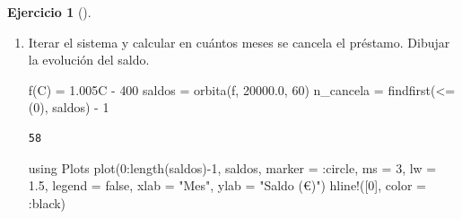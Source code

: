 \documentclass[
  spanish,
  a4paper,
]{scrreport}
\newenvironment{Shaded}{\begin{snugshade}}{\end{snugshade}}
\newcommand{\BuiltInTok}[1]{\textcolor[rgb]{0.00,0.23,0.31}{#1}}
\newcommand{\ConstantTok}[1]{\textcolor[rgb]{0.56,0.35,0.01}{#1}}
\newcommand{\FloatTok}[1]{\textcolor[rgb]{0.68,0.00,0.00}{#1}}
\newcommand{\FunctionTok}[1]{\textcolor[rgb]{0.28,0.35,0.67}{#1}}
\newcommand{\ImportTok}[1]{\textcolor[rgb]{0.00,0.46,0.62}{#1}}
\newcommand{\NormalTok}[1]{\textcolor[rgb]{0.00,0.23,0.31}{#1}}
\newcommand{\OperatorTok}[1]{\textcolor[rgb]{0.37,0.37,0.37}{#1}}
\newcommand{\StringTok}[1]{\textcolor[rgb]{0.13,0.47,0.30}{#1}}
\theoremstyle{definition}
\newtheorem{exercise}{Ejercicio}[chapter]
\theoremstyle{remark}
\begin{document}
\begin{exercise}[]
\begin{enumerate}
\begin{tcolorbox}
  $80000.0$

  El punto fijo es \(C^* = 80\,000\) €: es el saldo para el que los
  intereses (\(0.005\cdot 80000 = 400\)) igualan exactamente la cuota,
  de modo que la deuda no cambiaría. Como la pendiente es
  \(a = 1.005 > 1\), el punto fijo es \textbf{inestable}: si la deuda
  inicial es menor que 80 000 €, decrece hasta amortizarse; si fuera
  mayor, crecería sin control.

  \end{tcolorbox}
\item
  Iterar el sistema y calcular en cuántos meses se cancela el préstamo.
  Dibujar la evolución del saldo.

  \begin{tcolorbox}[enhanced jigsaw, arc=.35mm, bottomrule=.15mm, bottomtitle=1mm, breakable, colback=white, colbacktitle=quarto-callout-tip-color!10!white, colframe=quarto-callout-tip-color-frame, coltitle=black, left=2mm, leftrule=.75mm, opacityback=0, opacitybacktitle=0.6, rightrule=.15mm, title=\textcolor{quarto-callout-tip-color}{\faLightbulb}\hspace{0.5em}{Solución}, titlerule=0mm, toprule=.15mm, toptitle=1mm]

\begin{Shaded}
\begin{Highlighting}[]
\FunctionTok{f}\NormalTok{(C) }\OperatorTok{=} \FloatTok{1.005}\NormalTok{C }\OperatorTok{{-}} \FloatTok{400}
\NormalTok{saldos }\OperatorTok{=} \FunctionTok{orbita}\NormalTok{(f, }\FloatTok{20000.0}\NormalTok{, }\FloatTok{60}\NormalTok{)}
\NormalTok{n\_cancela }\OperatorTok{=} \FunctionTok{findfirst}\NormalTok{(}\OperatorTok{\textless{}=}\NormalTok{(}\FloatTok{0}\NormalTok{), saldos) }\OperatorTok{{-}} \FloatTok{1}
\end{Highlighting}
\end{Shaded}

\begin{verbatim}
58
\end{verbatim}

\begin{Shaded}
\begin{Highlighting}[]
\ImportTok{using} \BuiltInTok{Plots}
\FunctionTok{plot}\NormalTok{(}\FloatTok{0}\OperatorTok{:}\FunctionTok{length}\NormalTok{(saldos)}\OperatorTok{{-}}\FloatTok{1}\NormalTok{, saldos, marker }\OperatorTok{=} \OperatorTok{:}\NormalTok{circle, ms }\OperatorTok{=} \FloatTok{3}\NormalTok{, lw }\OperatorTok{=} \FloatTok{1.5}\NormalTok{,}
\NormalTok{    legend }\OperatorTok{=} \ConstantTok{false}\NormalTok{, xlab }\OperatorTok{=} \StringTok{"Mes"}\NormalTok{, ylab }\OperatorTok{=} \StringTok{"Saldo (€)"}\NormalTok{)}
\FunctionTok{hline!}\NormalTok{([}\FloatTok{0}\NormalTok{], color }\OperatorTok{=} \OperatorTok{:}\NormalTok{black)}
\end{Highlighting}
\end{Shaded}


\end{tcolorbox}
\end{enumerate}
\end{exercise}
\end{document}
